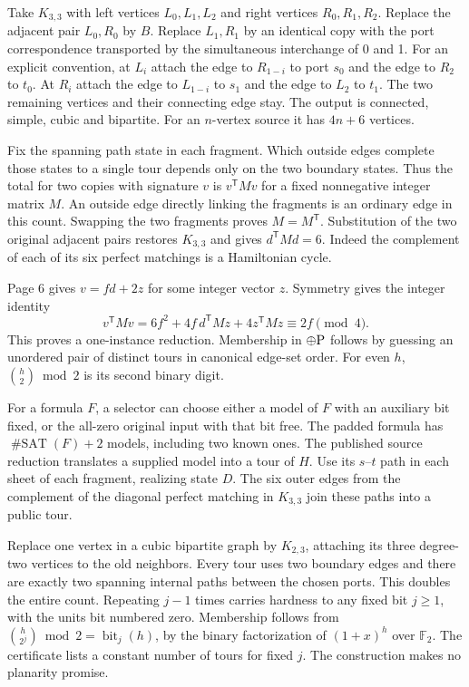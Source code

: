 \documentclass[11pt,letterpaper]{article}
\newcommand{\subh}[1]{\par\smallskip{\large\bfseries\color{teal}#1}\par\nobreak}
\newcommand{\GF}{\mathbb F_2}\newcommand{\sat}{\operatorname{\#SAT}}
\begin{document}
Take $K_{3,3}$ with left vertices $L_0,L_1,L_2$ and right vertices $R_0,R_1,R_2$. Replace the adjacent pair $L_0,R_0$ by $B$. Replace $L_1,R_1$ by an identical copy with the port correspondence transported by the simultaneous interchange of 0 and 1. For an explicit convention, at $L_i$ attach the edge to $R_{1-i}$ to port $s_0$ and the edge to $R_2$ to $t_0$. At $R_i$ attach the edge to $L_{1-i}$ to $s_1$ and the edge to $L_2$ to $t_1$. The two remaining vertices and their connecting edge stay. The output is connected, simple, cubic and bipartite. For an $n$-vertex source it has $4n+6$ vertices.

Fix the spanning path state in each fragment. Which outside edges complete those states to a single tour depends only on the two boundary states. Thus the total for two copies with signature $v$ is $v^\mathsf T Mv$ for a fixed nonnegative integer matrix $M$. An outside edge directly linking the fragments is an ordinary edge in this count. Swapping the two fragments proves $M=M^\mathsf T$. Substitution of the two original adjacent pairs restores $K_{3,3}$ and gives $d^\mathsf TMd=6$. Indeed the complement of each of its six perfect matchings is a Hamiltonian cycle.

Page 6 gives $v=fd+2z$ for some integer vector $z$. Symmetry gives the integer identity
\[
 v^\mathsf TMv=6f^2+4f\,d^\mathsf TMz+4z^\mathsf TMz
                 \equiv 2f\pmod4.
\]
This proves a one-instance reduction. Membership in $\mathord{\oplus}\mathrm P$ follows by guessing an unordered pair of distinct tours in canonical edge-set order. For even $h$, $\binom h2\bmod2$ is its second binary digit.

\subh{Supplied tours and higher fixed digits}
For a formula $F$, a selector can choose either a model of $F$ with an auxiliary bit fixed, or the all-zero original input with that bit free. The padded formula has $\sat(F)+2$ models, including two known ones. The published source reduction translates a supplied model into a tour of $H$. Use its $s$--$t$ path in each sheet of each fragment, realizing state $D$. The six outer edges from the complement of the diagonal perfect matching in $K_{3,3}$ join these paths into a public tour.

Replace one vertex in a cubic bipartite graph by $K_{2,3}$, attaching its three degree-two vertices to the old neighbors. Every tour uses two boundary edges and there are exactly two spanning internal paths between the chosen ports. This doubles the entire count. Repeating $j-1$ times carries hardness to any fixed bit $j\ge1$, with the units bit numbered zero. Membership follows from $\binom h{2^j}\bmod2=\operatorname{bit}_j(h)$, by the binary factorization of $(1+x)^h$ over $\GF$. The certificate lists a constant number of tours for fixed $j$. The construction makes no planarity promise.
\end{document}
